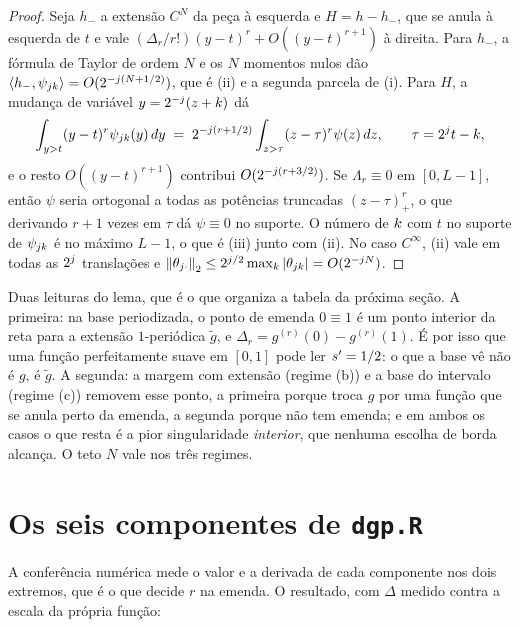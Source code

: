 \documentclass[11pt,a4paper]{article}
\begin{document}
\begin{proof}
Seja $h_{-}$ a extensão $C^{N}$ da peça à esquerda e $H = h - h_{-}$, que se
anula à esquerda de $t$ e vale $(\Delta_{r}/r!)(y-t)^{r} + O((y-t)^{r+1})$ à
direita. Para $h_{-}$, a fórmula de Taylor de ordem $N$ e os $N$ momentos
nulos dão $\langle h_{-}, \psi_{jk} \rangle = O(2^{-j(N+1/2)})$, que é (ii) e
a segunda parcela de (i). Para $H$, a mudança de variável $y = 2^{-j}(z +
k)$ dá
\[
  \int_{y>t}(y-t)^{r}\psi_{jk}(y)\,dy
  \;=\; 2^{-j(r+1/2)}\int_{z>\tau}(z-\tau)^{r}\psi(z)\,dz,
  \qquad \tau = 2^{j}t - k ,
\]
e o resto $O((y-t)^{r+1})$ contribui $O(2^{-j(r+3/2)})$. Se
$\Lambda_{r}\equiv 0$ em $[0,L-1]$, então $\psi$ seria ortogonal a todas as
potências truncadas $(z-\tau)_{+}^{r}$, o que derivando $r+1$ vezes em $\tau$
dá $\psi \equiv 0$ no suporte. O número de $k$ com $t$ no suporte de
$\psi_{jk}$ é no máximo $L-1$, o que é (iii) junto com (ii). No caso
$C^{\infty}$, (ii) vale em todas as $2^{j}$ translações e
$\left\lVert \theta_{j\cdot} \right\rVert_{2}\le 2^{j/2}\max_{k}|\theta_{jk}| =
O(2^{-j N})$.
\end{proof}

Duas leituras do lema, que é o que organiza a tabela da próxima seção. A
primeira: na base periodizada, o ponto de emenda $0\equiv 1$ é um ponto
interior da reta para a extensão $1$-periódica $\tilde g$, e
$\Delta_{r} = g^{(r)}(0) - g^{(r)}(1)$. É por isso que uma função perfeitamente
suave em $[0,1]$ pode ler $s' = 1/2$: o que a base vê não é $g$, é
$\tilde g$. A segunda: a margem com extensão (regime (b)) e a base do
intervalo (regime (c)) removem esse ponto, a primeira porque troca $g$ por
uma função que se anula perto da emenda, a segunda porque não tem emenda; e
em ambos os casos o que resta é a pior singularidade \emph{interior}, que
nenhuma escolha de borda alcança. O teto $N$ vale nos três regimes.

\section{Os seis componentes de \texttt{dgp.R}}

A conferência numérica mede o valor e a derivada de cada componente nos dois
extremos, que é o que decide $r$ na emenda. O resultado, com
$\Delta$ medido contra a escala da própria função:
\end{document}
